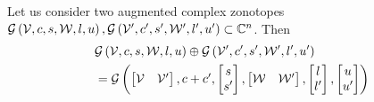 \begin{lemma}
Let us consider two augmented complex zonotopes
$\mathcal{G}\left(\mathcal{V},c,s,\mathcal{W},l,u\right),
\mathcal{G}\left(\mathcal{V}^\prime,c^\prime,s^\prime,\mathcal{W}^\prime,l^\prime,u^\prime\right)\subset\mathbb{C}^n$.
Then
%
\begin{align*}
& \mathcal{G}\left(\mathcal{V},c,s,\mathcal{W},l,u\right)\oplus \mathcal{G}\left(\mathcal{V}^\prime,c^\prime,s^\prime,\mathcal{W}^\prime,l^\prime,u^\prime\right)\\
& = \mathcal{G}\left(\left[\begin{matrix}
    \mathcal{V} &
    \mathcal{V}^\prime
  \end{matrix}\right]
,\begin{matrix}
    c+c^\prime
  \end{matrix}
,\left[\begin{matrix}
    s\\
    s^\prime
  \end{matrix}\right]
,\left[\begin{matrix}
    \mathcal{W} &
    \mathcal{W}^\prime
  \end{matrix}\right]
,\left[\begin{matrix}
    l\\
    l^\prime
  \end{matrix}\right]
,\left[\begin{matrix}
    u\\
    u^\prime
  \end{matrix}\right]
\right)
\end{align*}
%
\end{lemma}
%
